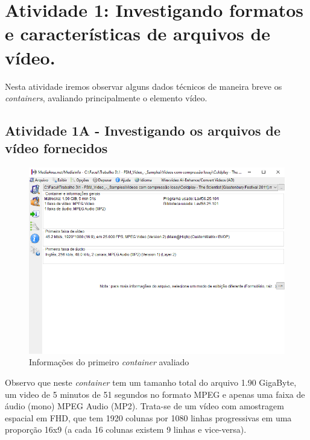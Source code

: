 \captionsetup{justification=centering,margin=0cm}
\label{cap:atividade1}  %

\chapter[Atividade 1: Investigando formatos e características de arquivos de vídeo.]{Atividade 1: Investigando formatos e características de arquivos de vídeo.}

Nesta atividade iremos observar alguns dados técnicos de maneira breve os \textit{containers}, avaliando principalmente o elemento vídeo.

\section{Atividade 1A - Investigando os arquivos de vídeo fornecidos}

\begin{figure}[H]
    \centering
    \caption{Informações do primeiro \textit{container} avaliado}
    \label{fig:imagem1}
    \includegraphics[scale=0.5]{Documeto/1-ElementosTextuais/images/01.png}
    
    \autoriaPropria
\end{figure}

Observo que neste \textit{container} tem um tamanho total do arquivo 1.90 GigaByte, um video de 5 minutos de 51 segundos no formato MPEG e apenas uma faixa de áudio (mono) MPEG Audio (MP2). Trata-se de um vídeo com amostragem espacial em FHD, que tem 1920 colunas por 1080 linhas progressivas em uma proporção 16x9 (a cada 16 colunas existem 9 linhas e vice-versa).


